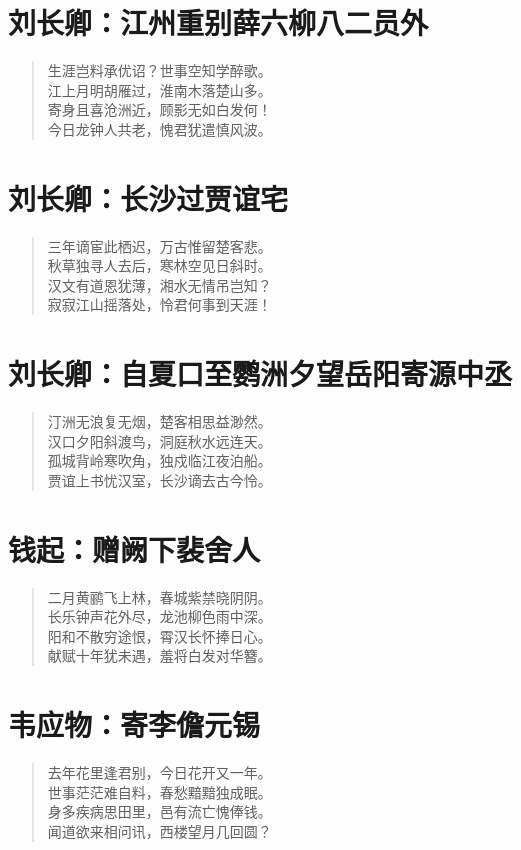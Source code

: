 \documentclass[12pt,oneside]{book}
\newenvironment{shici}{%
\begin{verse}\centering\yanti\large\hspace{12pt}}{\end{verse}}
\begin{document}
\begin{common-format}
\chapter{刘长卿：江州重别薛六柳八二员外}
\begin{shici}
生涯岂料承优诏？世事空知学醉歌。\\
江上月明胡雁过，淮南木落楚山多。\\
寄身且喜沧洲近，顾影无如白发何！\\
今日龙钟人共老，愧君犹遣慎风波。
\end{shici}

\chapter{刘长卿：长沙过贾谊宅}
\begin{shici}
三年谪宦此栖迟，万古惟留楚客悲。\\
秋草独寻人去后，寒林空见日斜时。\\
汉文有道恩犹薄，湘水无情吊岂知？\\
寂寂江山摇落处，怜君何事到天涯！
\end{shici}

\chapter{刘长卿：自夏口至鹦洲夕望岳阳寄源中丞}
\begin{shici}
汀洲无浪复无烟，楚客相思益渺然。\\
汉口夕阳斜渡鸟，洞庭秋水远连天。\\
孤城背岭寒吹角，独戍临江夜泊船。\\
贾谊上书忧汉室，长沙谪去古今怜。
\end{shici}

\chapter{钱起：赠阙下裴舍人}
\begin{shici}
二月黄鹂飞上林，春城紫禁晓阴阴。\\
长乐钟声花外尽，龙池柳色雨中深。\\
阳和不散穷途恨，霄汉长怀捧日心。\\
献赋十年犹未遇，羞将白发对华簪。
\end{shici}

\chapter{韦应物：寄李儋元锡}
\begin{shici}
去年花里逢君别，今日花开又一年。\\
世事茫茫难自料，春愁黯黯独成眠。\\
身多疾病思田里，邑有流亡愧俸钱。\\
闻道欲来相问讯，西楼望月几回圆？
\end{shici}


\end{common-format}
\end{document}
